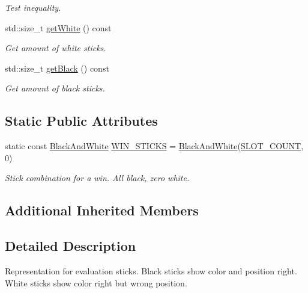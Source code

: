 \begin{DoxyCompactItemize}
\begin{DoxyCompactList}\small\item\em Test inequality. \end{DoxyCompactList}\item 
std\+::size\+\_\+t \hyperlink{classmastermind_1_1logic_1_1_black_and_white_a85a1deac6d5cae64adce52aee8604fb0}{get\+White} () const
\begin{DoxyCompactList}\small\item\em Get amount of white sticks. \end{DoxyCompactList}\item 
std\+::size\+\_\+t \hyperlink{classmastermind_1_1logic_1_1_black_and_white_a5215b8ea947ec23c323448b46ba9e897}{get\+Black} () const
\begin{DoxyCompactList}\small\item\em Get amount of black sticks. \end{DoxyCompactList}\end{DoxyCompactItemize}
\subsection*{Static Public Attributes}
\begin{DoxyCompactItemize}
\item 
static const \hyperlink{classmastermind_1_1logic_1_1_black_and_white}{Black\+And\+White} \hyperlink{classmastermind_1_1logic_1_1_black_and_white_a9c0ca1063cd6e8d41b0d87d510de33f5}{W\+I\+N\+\_\+\+S\+T\+I\+C\+KS} = \hyperlink{classmastermind_1_1logic_1_1_black_and_white}{Black\+And\+White}(\hyperlink{classmastermind_1_1_mastermind_ad4cfc8127641ff8dfe89d65ae232331c}{S\+L\+O\+T\+\_\+\+C\+O\+U\+NT}, 0)
\begin{DoxyCompactList}\small\item\em Stick combination for a win. All black, zero white. \end{DoxyCompactList}\end{DoxyCompactItemize}
\subsection*{Additional Inherited Members}


\subsection{Detailed Description}
Representation for evaluation sticks. Black sticks show color and position right. White sticks show color right but wrong position. 

